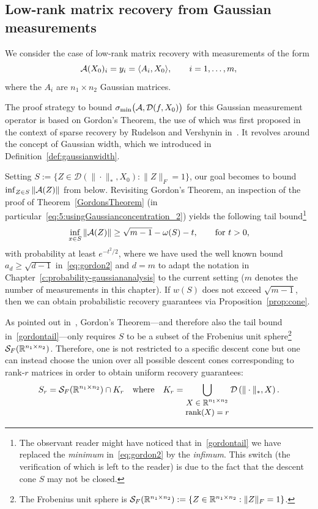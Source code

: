 \subsection{Low-rank matrix recovery from Gaussian measurements}\label{ss:matrixrecoverygaussian}

We consider the case of low-rank matrix recovery with measurements of the form
$$
{\mathcal A}(X_0)_i = y_i = \langle A_i,X_0 \rangle, \qquad i=1,\dots,m,
$$
where the $A_i$ are $n_1 \times n_2$  Gaussian matrices. 



The proof strategy to bound $\sigma_{\min}\big({\mathcal A},\mathcal{D}(f,X_0)\big)$ for this Gaussian measurement operator is based on  Gordon's Theorem, the use of which was first proposed in the context of sparse recovery by Rudelson and Vershynin in~\cite[Section 4]{rudelson2008sparse}. It revolves around the concept of Gaussian width, which we introduced in Definition~\ref{def:gaussianwidth}.

Setting $S:= \{Z \in \mathcal{D}(\|\cdot \|_*,X_0):\|Z\|_F =1\}$, our goal becomes to bound $\inf_{Z \in S} \|{\mathcal A}(Z)\|$ from below. 
Revisiting Gordon's Theorem,  an inspection of the proof of Theorem~\ref{GordonsTheorem} (in particular~\eqref{eq:5:usingGaussianconcentration_2}) yields the following tail bound\footnote{ The observant reader might have noticed that in~\eqref{gordontail} we have replaced the {\em minimum} in~\eqref{eq:gordon2} by the {\em infimum}. This switch (the verification of which is left to the reader) is due to the fact that the descent cone $S$ may not be closed.}
\begin{equation}\label{gordontail}
\inf_{x\in S} \| {\mathcal A}(Z) \| \geq \sqrt{m-1} - \omega(S) - t, \qquad \text{for $t > 0$,}
\end{equation}
with probability at least $e^{-t^2/2}$,
where we have used the well known bound $a_d \ge \sqrt{d-1}$ in~\eqref{eq:gordon2} and $d=m$  to adapt the notation in Chapter~\ref{c:probability-gaussiananalysis} to the current setting ($m$ denotes the number of measurements in this chapter).
If $w(S)$ does not exceed $\sqrt{m-1}$, then we can obtain probabilistic recovery guarantees via Proposition~\ref{prop:cone}.

As pointed out in~\cite{fuchs2022proof}, Gordon's Theorem---and therefore also the tail bound in~\eqref{gordontail}---only requires $S$ to be a subset of the Frobenius unit sphere\footnote{The Frobenius unit sphere is ${\mathcal S}_F(\mathbb{R}^{n_1\times n_2}):= \{Z\in \mathbb{R}^{n_1\times n_2}: \|Z\|_F=1\}$.} ${\mathcal S}_F(\mathbb{R}^{n_1\times n_2})$. Therefore, one is not
restricted to a specific descent cone but one can instead choose the union over all possible descent
cones corresponding to rank-$r$ matrices in order to obtain uniform recovery guarantees:
\begin{align*} 
S_r = {\mathcal S}_F(\mathbb{R}^{n_1\times n_2}) \cap K_r \quad \text{where} \quad K_r = \bigcup_{{\small 
\begin{matrix}
    X \in \mathbb{R}^{n_1\times n_2} \\ \operatorname{rank}(X)=r
\end{matrix} }}
 \mathcal{D} \left( \| \cdot \|_*, X \right).
\end{align*}


